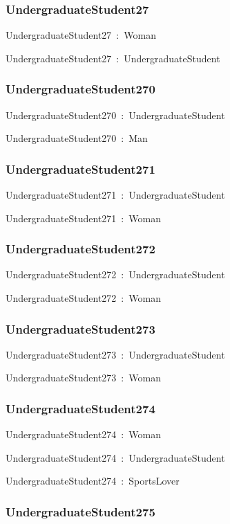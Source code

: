 \documentclass{article}
\begin{document}
\subsubsection*{UndergraduateStudent27}

UndergraduateStudent27~:~Woman

UndergraduateStudent27~:~UndergraduateStudent

\subsubsection*{UndergraduateStudent270}

UndergraduateStudent270~:~UndergraduateStudent

UndergraduateStudent270~:~Man

\subsubsection*{UndergraduateStudent271}

UndergraduateStudent271~:~UndergraduateStudent

UndergraduateStudent271~:~Woman

\subsubsection*{UndergraduateStudent272}

UndergraduateStudent272~:~UndergraduateStudent

UndergraduateStudent272~:~Woman

\subsubsection*{UndergraduateStudent273}

UndergraduateStudent273~:~UndergraduateStudent

UndergraduateStudent273~:~Woman

\subsubsection*{UndergraduateStudent274}

UndergraduateStudent274~:~Woman

UndergraduateStudent274~:~UndergraduateStudent

UndergraduateStudent274~:~SportsLover

\subsubsection*{UndergraduateStudent275}
\end{document}
